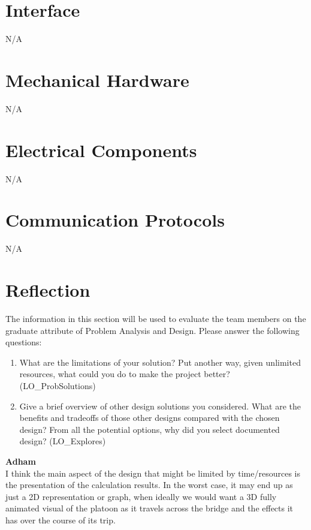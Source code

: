 \documentclass[12pt, titlepage]{article}
\begin{document}
% 

\newpage{}

\appendix

\section{Interface}

N/A

\section{Mechanical Hardware}
N/A
\section{Electrical Components}
N/A
\section{Communication Protocols}
N/A
\section{Reflection}

The information in this section will be used to evaluate the team members on the
graduate attribute of Problem Analysis and Design.  Please answer the following questions:

\begin{enumerate}
  \item What are the limitations of your solution?  Put another way, given
  unlimited resources, what could you do to make the project better? (LO\_ProbSolutions)
  \item Give a brief overview of other design solutions you considered.  What
  are the benefits and tradeoffs of those other designs compared with the chosen
  design?  From all the potential options, why did you select documented design?
  (LO\_Explores)
\end{enumerate}

\noindent\textbf{Adham}\\
I think the main aspect of the design that might be limited by time/resources is the presentation of the calculation results. In the worst case, it may end up as just a 2D
representation or graph, when ideally we would want a 3D fully animated visual of the platoon as it travels across the bridge and the effects it has over the course of its
trip.\\
\end{document}
